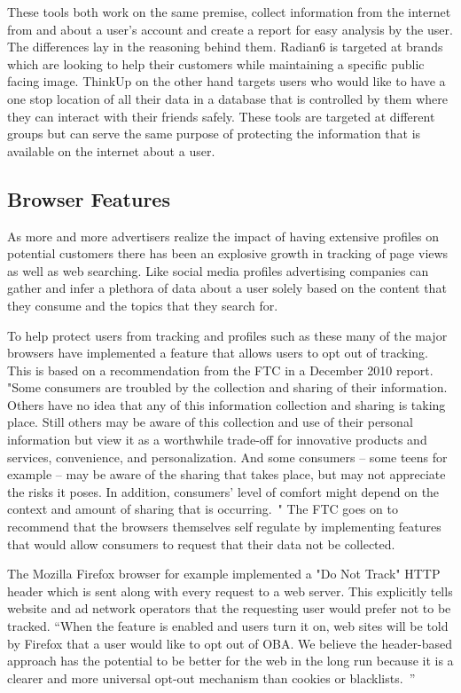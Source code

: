 These tools both work on the same premise, collect information from the internet
from and about a user's account and create a report for easy
analysis by the user. The differences lay in the reasoning behind them. Radian6
is targeted at brands which are looking to help their customers while
maintaining a specific public facing image. ThinkUp on the other hand targets
users who would like to have a one stop location of all their data in a database
that is controlled by them where they can interact with their friends safely.
These tools are targeted at different groups but can serve the same purpose of
protecting the information that is available on the internet about a user.

\subsection{Browser Features}
As more and more advertisers realize the impact of having extensive profiles on
potential customers there has been an explosive growth in tracking of page views
as well as web searching. Like social media profiles advertising companies can
gather and infer a plethora of data about a user solely based on the content
that they consume and the topics that they search for. 

To help protect users from tracking and profiles such as these many of the major
browsers have implemented a feature that allows users to opt out of tracking.
This is based on a recommendation from the FTC in a December 2010 report. "Some
consumers are troubled by the collection and sharing of their information.
Others have no idea that any of this information collection and sharing is
taking place. Still others may be aware of this collection and use of their
personal information but view it as a worthwhile trade-off for innovative
products and services, convenience, and personalization. And some consumers –
some teens for example – may be aware of the sharing that takes place, but may
not appreciate the risks it poses. In addition, consumers’ level of comfort
might depend on the context and amount of sharing that is occurring.~\cite{ftc}"
The FTC goes on to recommend that the browsers themselves self regulate by
implementing features that would allow consumers to request that their data not
be collected.

The Mozilla Firefox browser for example implemented a "Do Not Track" HTTP header
which is sent along with every request to a web server. This explicitly tells
website and ad network operators that the requesting user would prefer not to be
tracked. “When the feature is enabled and users turn it on, web sites will be
told by Firefox that a user would like to opt out of OBA. We believe the
header-based approach has the potential to be better for the web in the long run
because it is a clearer and more universal opt-out mechanism than cookies or
blacklists.~\cite{fpc}”

